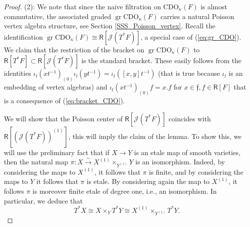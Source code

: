 \documentclass{amsart}
\theoremstyle{definition}
\newcommand{\Ring}{\mathsf{R}}
\newcommand{\gr}{\operatorname{gr}}
\newcommand{\Jet}{\mathscr{J}}
\newcommand{\ff}{\mathfrak{f}}
\newcommand{\CDO}{\mathrm{CDO}}
\numberwithin{equation}{section}
\begin{document}
\begin{proof}
(2): We note that since the naive filtration on $\CDO_\kappa(F)$ is almost commutative, the associated graded $\gr \CDO_\kappa(F)$ carries a natural Poisson vertex algebra structure, see Section \ref{SSS_Poisson_vertex}.  Recall the identification  $\gr\CDO_\kappa(F)\cong \Ring[\Jet(T^*F)]$,
a special case of (\ref{eq:gr_CDO}). We claim that the restriction of the bracket on $\gr\CDO_\kappa(F)$ to $\Ring[T^*F]\subset \Ring[\Jet(T^*F)]$ is the standard bracket. These easily follows from the identities $\iota_l(xt^{-1})_{(0)}\iota_l(yt^{-1})=\iota_l([x,y]t^{-1})$ (that is true because $\iota_l$ is an embedding of vertex algebras)
and $\iota_l(xt^{-1})_{(0)}f=x.f$ for $x\in \ff, f\in \Ring[F]$ that is a consequence of (\ref{eq:bracket_CDO}).

We will show that the Poisson center of $\Ring[\Jet(T^*F)]$ coincides with $\Ring[(\Jet(T^*F))^{(1)}]$, this will imply the claim of the lemma.
To show this, we will use the preliminary fact that if $X \rightarrow Y$ is an etale map of smooth varieties, then the natural map $\pi: X \xrightarrow{\sim} X^{(1)} \times_{Y^{(1)}} Y$ is an isomorphism. Indeed, by considering the maps to $X^{(1)}$, it follows that $\pi$ is finite, and by considering the maps to $Y$ it follows that $\pi$ is etale. By considering again the map to $X^{(1)}$, it follows $\pi$ is moreover finite etale of degree one, i.e., an isomorphism. In particular, we deduce that \begin{equation} \label{e:cacaw} T^* X \cong X \times_Y T^* Y \cong X^{(1)} \times_{Y^{(1)}} T^*Y.\end{equation}


\end{proof}
\end{document}
